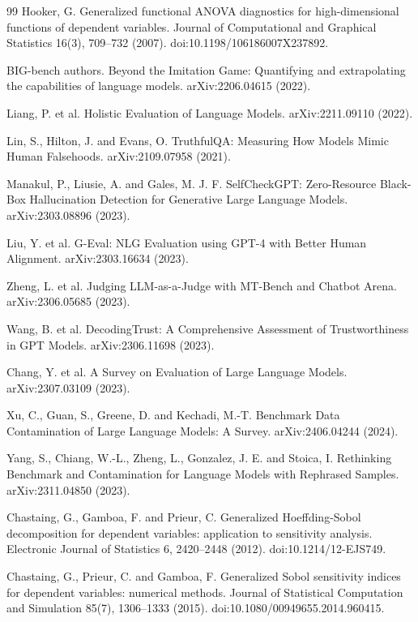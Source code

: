 \documentclass[11pt]{article}
\theoremstyle{remark}
\begin{document}
\begin{thebibliography}{99}
Hooker, G. Generalized functional ANOVA diagnostics for high-dimensional functions of dependent variables. Journal of Computational and Graphical Statistics 16(3), 709--732 (2007). doi:10.1198/106186007X237892.

BIG-bench authors. Beyond the Imitation Game: Quantifying and extrapolating the capabilities of language models. arXiv:2206.04615 (2022).

Liang, P. et al. Holistic Evaluation of Language Models. arXiv:2211.09110 (2022).

Lin, S., Hilton, J. and Evans, O. TruthfulQA: Measuring How Models Mimic Human Falsehoods. arXiv:2109.07958 (2021).

Manakul, P., Liusie, A. and Gales, M. J. F. SelfCheckGPT: Zero-Resource Black-Box Hallucination Detection for Generative Large Language Models. arXiv:2303.08896 (2023).

Liu, Y. et al. G-Eval: NLG Evaluation using GPT-4 with Better Human Alignment. arXiv:2303.16634 (2023).

Zheng, L. et al. Judging LLM-as-a-Judge with MT-Bench and Chatbot Arena. arXiv:2306.05685 (2023).

Wang, B. et al. DecodingTrust: A Comprehensive Assessment of Trustworthiness in GPT Models. arXiv:2306.11698 (2023).

Chang, Y. et al. A Survey on Evaluation of Large Language Models. arXiv:2307.03109 (2023).

Xu, C., Guan, S., Greene, D. and Kechadi, M.-T. Benchmark Data Contamination of Large Language Models: A Survey. arXiv:2406.04244 (2024).

Yang, S., Chiang, W.-L., Zheng, L., Gonzalez, J. E. and Stoica, I. Rethinking Benchmark and Contamination for Language Models with Rephrased Samples. arXiv:2311.04850 (2023).

Chastaing, G., Gamboa, F. and Prieur, C. Generalized Hoeffding-Sobol decomposition for dependent variables: application to sensitivity analysis. Electronic Journal of Statistics 6, 2420--2448 (2012). doi:10.1214/12-EJS749.

Chastaing, G., Prieur, C. and Gamboa, F. Generalized Sobol sensitivity indices for dependent variables: numerical methods. Journal of Statistical Computation and Simulation 85(7), 1306--1333 (2015). doi:10.1080/00949655.2014.960415.


\end{thebibliography}
\end{document}
